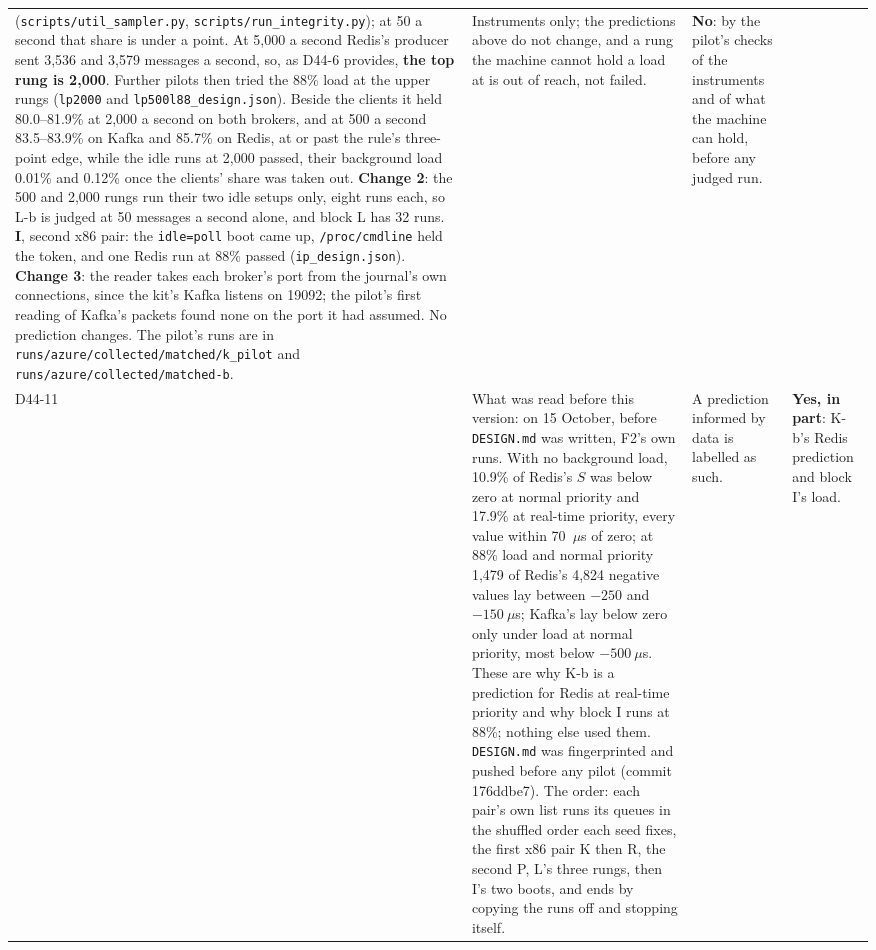 \documentclass[11pt]{article}
\begin{document}
{\begin{longtable}{@{}p{1.1cm} >{\raggedright\arraybackslash}p{6.1cm} >{\raggedright\arraybackslash}p{6.0cm} >{\raggedright\arraybackslash}p{2.2cm}@{}}
(\texttt{scripts/util\_sampler.py}, \texttt{scripts/run\_integrity.py}); at 50 a second that share
is under a point. At 5,000 a second Redis's producer sent 3,536 and 3,579 messages a second, so, as
D44-6 provides, \textbf{the top rung is 2,000}. Further pilots then tried the 88\% load at the
upper rungs (\texttt{lp2000} and \texttt{lp500l88\_design.json}). Beside the clients it held
80.0--81.9\% at 2,000 a second on both brokers, and at 500 a second 83.5--83.9\% on Kafka and 85.7\%
on Redis, at or past the rule's three-point edge, while the idle runs at 2,000 passed, their
background load 0.01\% and 0.12\% once the clients' share was taken out. \textbf{Change 2}: the
500 and 2,000 rungs run their two idle setups only, eight runs each, so L-b is judged at 50
messages a second alone, and block L has 32 runs. \textbf{I}, second x86 pair: the
\texttt{idle=poll} boot came up, \texttt{/proc/cmdline} held the token, and one Redis run at 88\%
passed (\texttt{ip\_design.json}). \textbf{Change 3}: the reader takes each broker's port from the
journal's own connections, since the kit's Kafka listens on 19092; the pilot's first reading of
Kafka's packets found none on the port it had assumed. No prediction changes. The pilot's runs are
in \texttt{runs/azure/collected/matched/k\_pilot} and \texttt{runs/azure/collected/matched-b}. & Instruments only; the predictions above do not change, and a rung the machine cannot hold a load at is out of reach, not failed. & \textbf{No}: by the pilot's checks of the instruments and of what the machine can hold, before any judged run. \\
D44-11 & What was read before this version: on 15 October, before \texttt{DESIGN.md} was written, F2's own runs. With no background load, 10.9\% of Redis's $S$ was below zero at normal priority and 17.9\% at real-time priority, every value within 70~$\mu$s of zero; at 88\% load and normal priority 1,479 of Redis's 4,824 negative values lay between $-250$ and $-150~\mu$s; Kafka's lay below zero only under load at normal priority, most below $-500~\mu$s. These are why K-b is a prediction for Redis at real-time priority and why block I runs at 88\%; nothing else used them. \texttt{DESIGN.md} was fingerprinted and pushed before any pilot (commit 176ddbe7). The order: each pair's own list runs its queues in the shuffled order each seed fixes, the first x86 pair K then R, the second P, L's three rungs, then I's two boots, and ends by copying the runs off and stopping itself. & A prediction informed by data is labelled as such. & \textbf{Yes, in part}: K-b's Redis prediction and block I's load. \\
\bottomrule
\end{longtable}}
\end{document}
